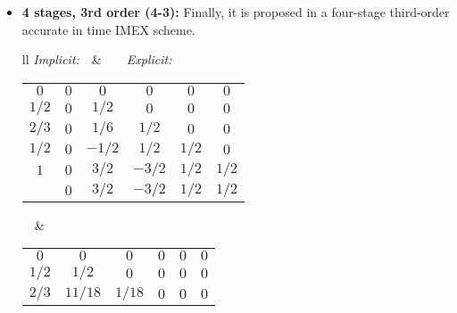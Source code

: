 \begin{itemize}
\begin{center}
\begin{tabular}{l}
\textit{Implicit:}\\
\begin{tabular}{c|cccc}
$0$&$0$&$0$&$0$&$0$\\
$0.4358665215$&$0$&$0.4358665215$&$0$&$0$\\
$0.7179332608$&$0$&$0.2820667392$&$0.4358665215$&$0$\\
$1$&$0$&$1.208496649$&$-0.644363171$&$0.4358665215$\\
\hline
&$0$&$1.208496649$&$-0.644363171$&$0.4358665215$
\end{tabular}\\
\textit{Explicit:}\\
\begin{tabular}{c|cccc}
$0$&$0$&$0$&$0$&$0$\\
$0.4358665215$&$0.4358665215$&$0$&$0$&$0$\\
$0.7179332608$&$0.3212788860$&$0.3966543747$&$0$&$0$\\
$1$&$-0.105858296$&$0.5529291479$&$0.5529291479$&$0$\\
\hline
&$0$&$1.208496649$&$-0.644363171$&$0.4358665215$
\end{tabular}
\end{tabular}
\end{center}
\item \textbf{4 stages, 3rd order (4-3):}
Finally, it is proposed in \cite{ascher_implicit-explicit_1997} a four-stage third-order accurate in time IMEX scheme.
\begin{center}
\begin{tabular}{ll}
\textit{Implicit:}$\quad$&$\quad\quad$\textit{Explicit:}\\
\begin{tabular}{c|ccccc}
$0$&$0$&$0$&$0$&$0$&$0$\\
$1/2$&$0$&$1/2$&$0$&$0$&$0$\\
$2/3$&$0$&$1/6$&$1/2$&$0$&$0$\\
$1/2$&$0$&$-1/2$&$1/2$&$1/2$&$0$\\
$1$&$0$&$3/2$&$-3/2$&$1/2$&$1/2$\\
\hline
&$0$&$3/2$&$-3/2$&$1/2$&$1/2$
\end{tabular}$\quad$&
$\quad\quad$\begin{tabular}{c|ccccc}
$0$&$0$&$0$&$0$&$0$&$0$\\
$1/2$&$1/2$&$0$&$0$&$0$&$0$\\
$2/3$&$11/18$&$1/18$&$0$&$0$&$0$\\

\end{tabular}
\end{tabular}
\end{center}
\end{itemize}
